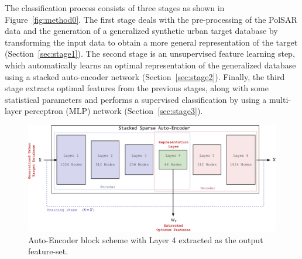 The classification process consists of three stages as shown in Figure~\ref{fig:method0}. The first stage deals with the pre-processing of the PolSAR data and the generation of a generalized synthetic urban target database by transforming the input data to obtain a more general representation of the target (Section~\ref{sec:stage1}). The second stage is an unsupervised feature learning step, which automatically learns an optimal representation of the generalized database using a stacked auto-encoder network (Section~\ref{sec:stage2}). Finally, the third stage extracts optimal features from the previous stages, along with some statistical parameters and performs a supervised classification by using a multi-layer perceptron (MLP) network (Section~\ref{sec:stage3}). 






\begin{figure}[!htb]
\centering
	\includegraphics[width = 0.95\columnwidth]{Figures/Trento/Method2}
	\caption[PolSAR data preprocessing Stage 2]{ Auto-Encoder block scheme with Layer 4 extracted as the output feature-set. }
	\label{fig:method2}
\end{figure}



